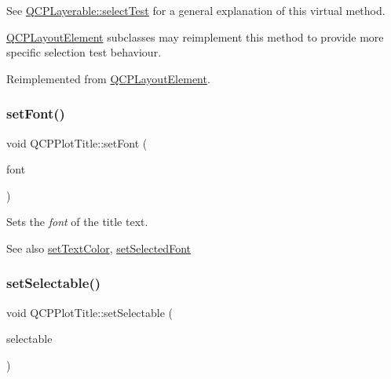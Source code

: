 See \hyperlink{class_q_c_p_layerable_a04db8351fefd44cfdb77958e75c6288e}{Q\+C\+P\+Layerable\+::select\+Test} for a general explanation of this virtual method.

\hyperlink{class_q_c_p_layout_element}{Q\+C\+P\+Layout\+Element} subclasses may reimplement this method to provide more specific selection test behaviour. 

Reimplemented from \hyperlink{class_q_c_p_layout_element_a0b96ae0d7bcfa6e38188fcb1e73e143f}{Q\+C\+P\+Layout\+Element}.

\hypertarget{class_q_c_p_plot_title_a199fc7170802ea65006c371875349e37}{}\label{class_q_c_p_plot_title_a199fc7170802ea65006c371875349e37} 
\subsubsection{\texorpdfstring{set\+Font()}{setFont()}}
{\footnotesize\ttfamily void Q\+C\+P\+Plot\+Title\+::set\+Font (\begin{DoxyParamCaption}\item[{const Q\+Font \&}]{font }\end{DoxyParamCaption})}

Sets the {\itshape font} of the title text.

\begin{DoxySeeAlso}{See also}
\hyperlink{class_q_c_p_plot_title_a71273e3a0ca6b4c151591b37b9e5ce33}{set\+Text\+Color}, \hyperlink{class_q_c_p_plot_title_a5245980ead999ceed51dbe702d0e3131}{set\+Selected\+Font} 
\end{DoxySeeAlso}
\hypertarget{class_q_c_p_plot_title_a8866b07b9fa14877d4cefbf38406c5dd}{}\label{class_q_c_p_plot_title_a8866b07b9fa14877d4cefbf38406c5dd} 
\subsubsection{\texorpdfstring{set\+Selectable()}{setSelectable()}}
{\footnotesize\ttfamily void Q\+C\+P\+Plot\+Title\+::set\+Selectable (\begin{DoxyParamCaption}\item[{bool}]{selectable }\end{DoxyParamCaption})}

